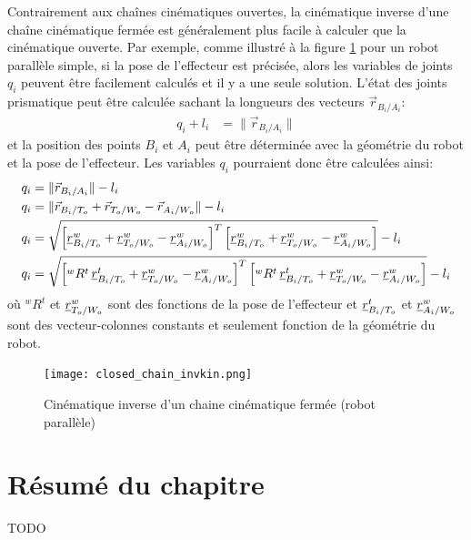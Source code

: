 Contrairement aux chaînes cinématiques ouvertes, la cinématique inverse d'une chaîne cinématique fermée est généralement plus facile à calculer que la cinématique ouverte. Par exemple, comme illustré à la figure \ref{fig:closed_chain_invkin} pour un robot parallèle simple, si la pose de l'effecteur est précisée, alors les variables de joints $q_i$ peuvent être facilement calculés et il y a une seule solution. L'état des joints prismatique peut être calculée sachant la longueurs des vecteurs $\vec{r}_{B_i/A_i}$:
\begin{align}
q_i + l_i &= \| \vec{r}_{B_i/A_i} \|
\end{align} 
et la position des points $B_i$ et $A_i$ peut être déterminée avec la géométrie du robot et la pose de l'effecteur. Les variables $q_i$ pourraient donc être calculées ainsi:
\begin{align}
q_i &= \| \vec{r}_{B_i/A_i} \| - l_i \\
q_i &= \| \vec{r}_{B_i/T_o} +  \vec{r}_{T_o/W_o} - \vec{r}_{A_i/W_o} \| - l_i \\
q_i &= \sqrt{\left[  \underline{r}_{B_i/T_o}^w + \underline{r}_{T_o/W_o}^w - \underline{r}_{A_i/W_o}^w
\right]^T \left[  \underline{r}_{B_i/T_o}^w + \underline{r}_{T_o/W_o}^w - \underline{r}_{A_i/W_o}^w
\right]} - l_i \\
q_i &= \sqrt{\left[  {}^wR^t \, \underline{r}_{B_i/T_o}^t + \underline{r}_{T_o/W_o}^w - \underline{r}_{A_i/W_o}^w
\right]^T \left[  {}^wR^t \, \underline{r}_{B_i/T_o}^t + \underline{r}_{T_o/W_o}^w - \underline{r}_{A_i/W_o}^w \right]} - l_i
\end{align} 
où ${}^wR^t$ et $\underline{r}_{T_o/W_o}^w$ sont des fonctions de la pose de l'effecteur et $\underline{r}_{B_i/T_o}^t$ et $\underline{r}_{A_i/W_o}^w$ sont des vecteur-colonnes constants et seulement fonction de la géométrie du robot. 

\begin{figure}[H]
	\centering
		\texttt{[image: closed\_chain\_invkin.png]}
	\caption{Cinématique inverse d'un chaine cinématique fermée (robot parallèle)}
	\label{fig:closed_chain_invkin}
\end{figure}




\newpage
\section{Résumé du chapitre}

TODO

